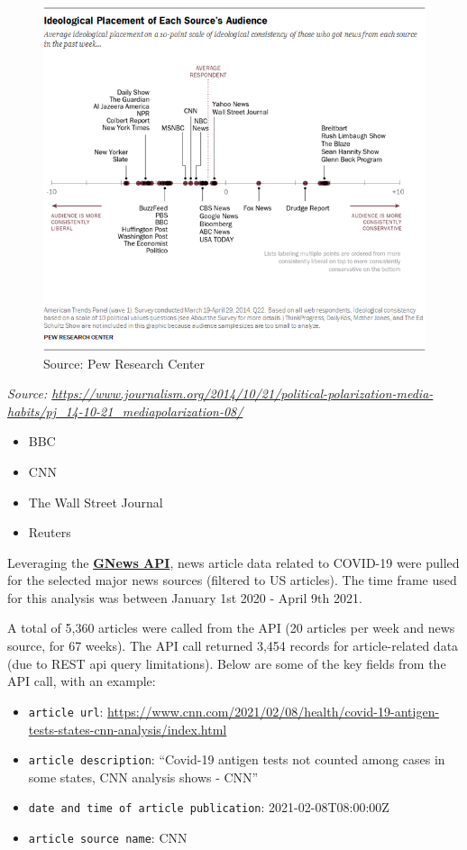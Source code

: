 \documentclass[
]{article}
\begin{document}
\begin{figure}
\centering
\includegraphics{../figures/PJ_14.10.21_mediaPolarization-08.png}
\caption{Source: Pew Research Center}
\end{figure}

\emph{Source:
\url{https://www.journalism.org/2014/10/21/political-polarization-media-habits/pj_14-10-21_mediapolarization-08/}}

\begin{itemize}
\item
  BBC
\item
  CNN
\item
  The Wall Street Journal
\item
  Reuters
\end{itemize}

Leveraging the \textbf{\href{https://gnewsapi.net/}{GNews API}}, news
article data related to COVID-19 were pulled for the selected major news
sources (filtered to US articles). The time frame used for this analysis
was between January 1st 2020 - April 9th 2021.

A total of 5,360 articles were called from the API (20 articles per week
and news source, for 67 weeks). The API call returned 3,454 records for
article-related data (due to REST api query limitations). Below are some
of the key fields from the API call, with an example:

\begin{itemize}
\item
  \texttt{article\ url}:
  \url{https://www.cnn.com/2021/02/08/health/covid-19-antigen-tests-states-cnn-analysis/index.html}
\item
  \texttt{article\ description}: ``Covid-19 antigen tests not counted
  among cases in some states, CNN analysis shows - CNN''
\item
  \texttt{date\ and\ time\ of\ article\ publication}:
  2021-02-08T08:00:00Z
\item
  \texttt{article\ source\ name}: CNN
\end{itemize}
\end{document}
